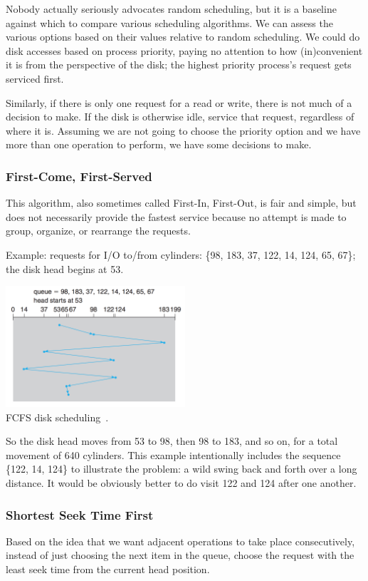 Nobody actually seriously advocates random scheduling, but it is a baseline against which to compare various scheduling algorithms. We can assess the various options based on their values relative to random scheduling. We could do disk accesses based on process priority, paying no attention to how (in)convenient it is from the perspective of the disk; the highest priority process's request gets serviced first. 

Similarly, if there is only one request for a read or write, there is not much of a decision to make. If the disk is otherwise idle, service that request, regardless of where it is. Assuming we are not going to choose the priority option and we have more than one operation to perform, we have some decisions to make.

\subsubsection*{First-Come, First-Served}
This algorithm, also sometimes called First-In, First-Out, is fair and simple, but does not necessarily provide the fastest service because no attempt is made to group, organize, or rearrange the requests.

Example: requests for I/O to/from cylinders: \{98, 183, 37, 122, 14, 124, 65, 67\}; the disk head begins at 53.

\begin{center}
	\includegraphics[width=0.5\textwidth]{images/disk-fcfs.png}\\
	FCFS disk scheduling~\cite{osc}.
\end{center}

So the disk head moves from 53 to 98, then 98 to 183, and so on, for a total movement of 640 cylinders. This example intentionally includes the sequence \{122, 14, 124\} to illustrate the problem: a wild swing back and forth over a long distance. It would be obviously better to do visit 122 and 124 after one another. 

\subsubsection*{Shortest Seek Time First}
Based on the idea that we want adjacent operations to take place consecutively, instead of just choosing the next item in the queue, choose the request with the least seek time from the current head position.

